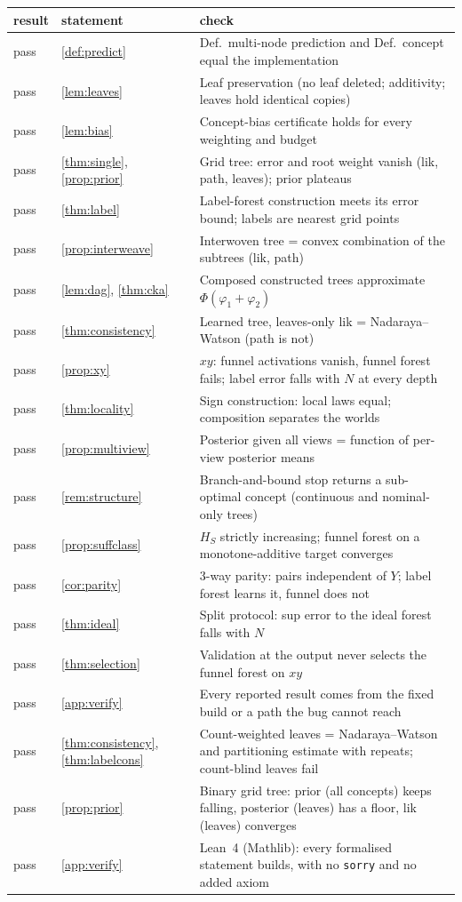 \begin{tabular}{@{}llp{9.2cm}@{}}\toprule
result & statement & check\\\midrule
pass & \cref{def:predict} & Def.~multi-node prediction and Def.~concept equal the implementation\\
pass & \cref{lem:leaves} & Leaf preservation (no leaf deleted; additivity; leaves hold identical copies)\\
pass & \cref{lem:bias} & Concept-bias certificate holds for every weighting and budget\\
pass & \cref{thm:single}, \cref{prop:prior} & Grid tree: error and root weight vanish (lik, path, leaves); prior plateaus\\
pass & \cref{thm:label} & Label-forest construction meets its error bound; labels are nearest grid points\\
pass & \cref{prop:interweave} & Interwoven tree = convex combination of the subtrees (lik, path)\\
pass & \cref{lem:dag}, \cref{thm:cka} & Composed constructed trees approximate $\Phi(\varphi_1+\varphi_2)$\\
pass & \cref{thm:consistency} & Learned tree, leaves-only lik = Nadaraya--Watson (path is not)\\
pass & \cref{prop:xy} & $xy$: funnel activations vanish, funnel forest fails; label error falls with $N$ at every depth\\
pass & \cref{thm:locality} & Sign construction: local laws equal; composition separates the worlds\\
pass & \cref{prop:multiview} & Posterior given all views = function of per-view posterior means\\
pass & \cref{rem:structure} & Branch-and-bound stop returns a sub-optimal concept (continuous and nominal-only trees)\\
pass & \cref{prop:suffclass} & $H_S$ strictly increasing; funnel forest on a monotone-additive target converges\\
pass & \cref{cor:parity} & 3-way parity: pairs independent of $Y$; label forest learns it, funnel does not\\
pass & \cref{thm:ideal} & Split protocol: sup error to the ideal forest falls with $N$\\
pass & \cref{thm:selection} & Validation at the output never selects the funnel forest on $xy$\\
pass & \cref{app:verify} & Every reported result comes from the fixed build or a path the bug cannot reach\\
pass & \cref{thm:consistency}, \cref{thm:labelcons} & Count-weighted leaves = Nadaraya--Watson and partitioning estimate with repeats; count-blind leaves fail\\
pass & \cref{prop:prior} & Binary grid tree: prior (all concepts) keeps falling, posterior (leaves) has a floor, lik (leaves) converges\\
pass & \cref{app:verify} & Lean~4 (Mathlib): every formalised statement builds, with no \texttt{sorry} and no added axiom\\
\bottomrule\end{tabular}